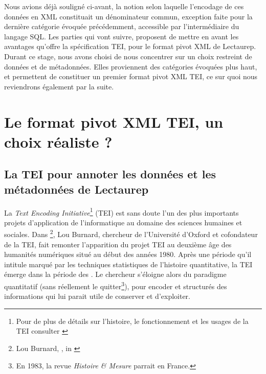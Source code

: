 Nous avions déjà souligné ci-avant, la notion selon laquelle l'encodage de ces données en XML constituait un dénominateur commun, exception faite pour la dernière catégorie évoquée précédemment, accessible par l'intermédiaire du langage SQL. Les parties qui vont suivre, proposent de mettre en avant les avantages qu'offre la spécification TEI, pour le format pivot XML de Lectaurep. Durant ce stage, nous avons choisi de nous concentrer sur un choix restreint de données et de métadonnées. Elles proviennent des catégories évoquées plus haut, et permettent de constituer un premier format pivot XML TEI, ce sur quoi nous reviendrons également par la suite. 

\section{Le format pivot XML TEI, un choix réaliste ?}
\subsection{La TEI pour annoter les données et les métadonnées de Lectaurep}

La \textit{Text Encoding Initiative}\footnote{Pour de plus de détails sur l'histoire, le fonctionnement et les usages de la TEI consulter \cite{burnard_quest-ce_2015}} (TEI) est sans doute l'un des plus importants projets d'application de l'informatique au domaine des sciences humaines et sociales. Dans \footnote{Lou Burnard, , in \cite{mounier_dir_readwrite_2012}}, Lou Burnard, chercheur de l'Université d'Oxford et cofondateur de la TEI, fait remonter l'apparition du projet TEI au deuxième âge des humanités numériques situé au début des années 1980.  Après une période qu'il intitule  marqué par les techniques statistiques de l'histoire quantitative, la TEI émerge dans la période des . Le chercheur s'éloigne alors du paradigme quantitatif (sans réellement le quitter\footnote{En 1983, la revue \textit{Histoire \& Mesure} parrait en France.}), pour encoder et structurés des informations qui lui parait utile de conserver et d'exploiter.

